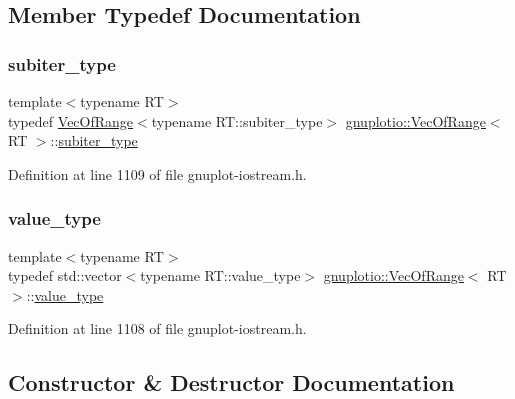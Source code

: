 \subsection{Member Typedef Documentation}
\mbox{\label{classgnuplotio_1_1_vec_of_range_a4cfae20b9797febceffafec3415b52db}} 
\subsubsection{\texorpdfstring{subiter\+\_\+type}{subiter\_type}}
{\footnotesize\ttfamily template$<$typename RT$>$ \\
typedef \hyperlink{classgnuplotio_1_1_vec_of_range}{Vec\+Of\+Range}$<$typename R\+T\+::subiter\+\_\+type$>$ \hyperlink{classgnuplotio_1_1_vec_of_range}{gnuplotio\+::\+Vec\+Of\+Range}$<$ RT $>$\+::\hyperlink{classgnuplotio_1_1_vec_of_range_a4cfae20b9797febceffafec3415b52db}{subiter\+\_\+type}}



Definition at line 1109 of file gnuplot-\/iostream.\+h.

\mbox{\label{classgnuplotio_1_1_vec_of_range_aed503f2f8d8ed71b303f2db26872bafd}} 
\subsubsection{\texorpdfstring{value\+\_\+type}{value\_type}}
{\footnotesize\ttfamily template$<$typename RT$>$ \\
typedef std\+::vector$<$typename R\+T\+::value\+\_\+type$>$ \hyperlink{classgnuplotio_1_1_vec_of_range}{gnuplotio\+::\+Vec\+Of\+Range}$<$ RT $>$\+::\hyperlink{classgnuplotio_1_1_vec_of_range_aed503f2f8d8ed71b303f2db26872bafd}{value\+\_\+type}}



Definition at line 1108 of file gnuplot-\/iostream.\+h.



\subsection{Constructor \& Destructor Documentation}
\mbox{\label{classgnuplotio_1_1_vec_of_range_a077cf69b9ea96d4f0da78a5e72ab2427}} 
